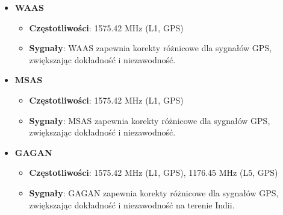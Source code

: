 \begin{itemize}
    \item \textbf{WAAS}
    \begin{itemize}
        \item \textbf{Częstotliwości}: 1575.42 MHz (L1, GPS)
        \item \textbf{Sygnały}: WAAS zapewnia korekty różnicowe dla sygnałów GPS, zwiększając dokładność i niezawodność.
    \end{itemize}

    \item \textbf{MSAS}
    \begin{itemize}
        \item \textbf{Częstotliwości}: 1575.42 MHz (L1, GPS)
        \item \textbf{Sygnały}: MSAS zapewnia korekty różnicowe dla sygnałów GPS, zwiększając dokładność i niezawodność.
    \end{itemize}

    \item \textbf{GAGAN}
    \begin{itemize}
        \item \textbf{Częstotliwości}: 1575.42 MHz (L1, GPS), 1176.45 MHz (L5, GPS)
        \item \textbf{Sygnały}: GAGAN zapewnia korekty różnicowe dla sygnałów GPS, zwiększając dokładność i niezawodność na terenie Indii.
    \end{itemize}
\end{itemize}
